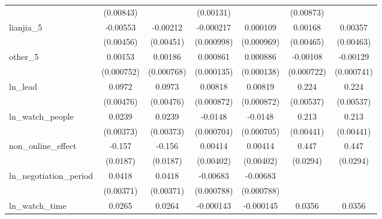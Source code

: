{\begin{tabular}{l*{6}{c}}
            &   (0.00843)         &                     &   (0.00131)         &                     &   (0.00873)         &                     \\
\addlinespace
lianjia\_5   &    -0.00553         &    -0.00212         &   -0.000217         &    0.000109         &     0.00168         &     0.00357         \\
            &   (0.00456)         &   (0.00451)         &  (0.000998)         &  (0.000969)         &   (0.00465)         &   (0.00463)         \\
\addlinespace
other\_5     &     0.00153\sym{**} &     0.00186\sym{**} &    0.000861\sym{***}&    0.000886\sym{***}&    -0.00108         &    -0.00129\sym{*}  \\
            &  (0.000752)         &  (0.000768)         &  (0.000135)         &  (0.000138)         &  (0.000722)         &  (0.000741)         \\
\addlinespace
ln\_lead     &      0.0972\sym{***}&      0.0973\sym{***}&     0.00818\sym{***}&     0.00819\sym{***}&       0.224\sym{***}&       0.224\sym{***}\\
            &   (0.00476)         &   (0.00476)         &  (0.000872)         &  (0.000872)         &   (0.00537)         &   (0.00537)         \\
\addlinespace
ln\_watch\_people&      0.0239\sym{***}&      0.0239\sym{***}&     -0.0148\sym{***}&     -0.0148\sym{***}&       0.213\sym{***}&       0.213\sym{***}\\
            &   (0.00373)         &   (0.00373)         &  (0.000704)         &  (0.000705)         &   (0.00441)         &   (0.00441)         \\
\addlinespace
non\_online\_effect&      -0.157\sym{***}&      -0.156\sym{***}&     0.00414         &     0.00414         &       0.447\sym{***}&       0.447\sym{***}\\
            &    (0.0187)         &    (0.0187)         &   (0.00402)         &   (0.00402)         &    (0.0294)         &    (0.0294)         \\
\addlinespace
ln\_negotiation\_period&      0.0418\sym{***}&      0.0418\sym{***}&    -0.00683\sym{***}&    -0.00683\sym{***}&                     &                     \\
            &   (0.00371)         &   (0.00371)         &  (0.000788)         &  (0.000788)         &                     &                     \\
\addlinespace
ln\_watch\_time&      0.0265\sym{***}&      0.0264\sym{***}&   -0.000143         &   -0.000145         &      0.0356\sym{***}&      0.0356\sym{***}\\

\end{tabular}}

